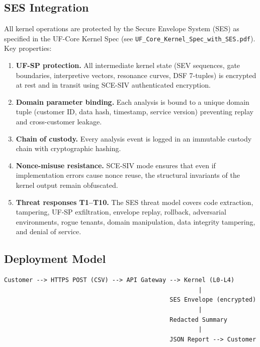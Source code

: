 \documentclass[11pt,letterpaper]{article}
\begin{document}
\subsection{SES Integration}

All kernel operations are protected by the Secure Envelope System (SES)
as specified in the UF-Core Kernel Spec (see
\texttt{UF\_Core\_Kernel\_Spec\_with\_SES.pdf}). Key properties:

\begin{enumerate}
  \item \textbf{UF-SP protection.} All intermediate kernel state (SEV
    sequences, gate boundaries, interpretive vectors, resonance curves,
    DSF 7-tuples) is encrypted at rest and in transit using SCE-SIV
    authenticated encryption.
  \item \textbf{Domain parameter binding.} Each analysis is bound to a
    unique domain tuple (customer ID, data hash, timestamp, service
    version) preventing replay and cross-customer leakage.
  \item \textbf{Chain of custody.} Every analysis event is logged in an
    immutable custody chain with cryptographic hashing.
  \item \textbf{Nonce-misuse resistance.} SCE-SIV mode ensures that
    even if implementation errors cause nonce reuse, the structural
    invariants of the kernel output remain obfuscated.
  \item \textbf{Threat responses T1--T10.} The SES threat model covers
    code extraction, tampering, UF-SP exfiltration, envelope replay,
    rollback, adversarial environments, rogue tenants, domain
    manipulation, data integrity tampering, and denial of service.
\end{enumerate}

\subsection{Deployment Model}

\begin{verbatim}
Customer --> HTTPS POST (CSV) --> API Gateway --> Kernel (L0-L4)
                                                      |
                                              SES Envelope (encrypted)
                                                      |
                                              Redacted Summary
                                                      |
                                              JSON Report --> Customer
\end{verbatim}
\end{document}
